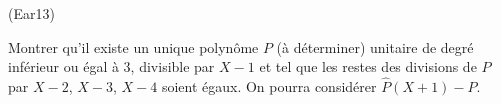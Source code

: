 \begin{tiny}(Ear13)\end{tiny} Montrer qu'il existe un unique polyn{\^o}me $P$ (à déterminer) unitaire de degr{\'e} inf{\'e}rieur ou {\'e}gal {\`a} 3, divisible par $X-1$ et tel que les restes des divisions de $P$ par $X-2$, $X-3$, $X-4$ soient {\'e}gaux. On pourra considérer $\widehat{P}(X+1)-P$.